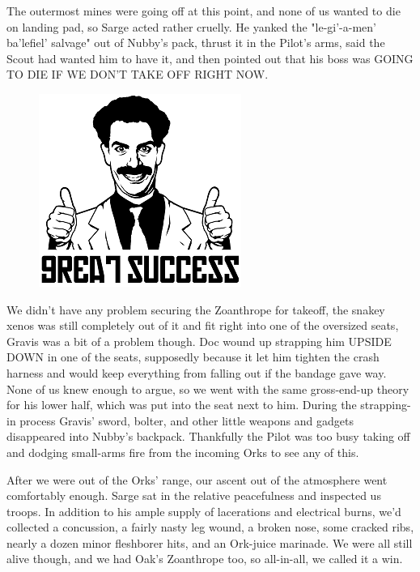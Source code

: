 The outermost mines were going off at this point, and none of us wanted to die on landing pad, so Sarge acted rather cruelly. 
He yanked the "le-gi'-a-men' ba'lefiel' salvage" out of Nubby's pack, thrust it in the Pilot's arms, said the Scout had wanted him to have it, and then pointed out that his boss was GOING TO DIE IF WE DON'T TAKE OFF RIGHT NOW.

\begin{figure}
	\begin{center}
		\includegraphics[width=\figwidth]{pics/12/58.png}
	\end{center}
\end{figure}
We didn't have any problem securing the Zoanthrope for takeoff, the snakey xenos was still completely out of it and fit right into one of the oversized seats, Gravis was a bit of a problem though. 
Doc wound up strapping him UPSIDE DOWN in one of the seats, supposedly because it let him tighten the crash harness and would keep everything from falling out if the bandage gave way. 
None of us knew enough to argue, so we went with the same gross-end-up theory for his lower half, which was put into the seat next to him. 
During the strapping-in process Gravis' sword, bolter, and other little weapons and gadgets disappeared into Nubby's backpack. 
Thankfully the Pilot was too busy taking off and dodging small-arms fire from the incoming Orks to see any of this.

After we were out of the Orks' range, our ascent out of the atmosphere went comfortably enough. 
Sarge sat in the relative peacefulness and inspected us troops. 
In addition to his ample supply of lacerations and electrical burns, we'd collected a concussion, a fairly nasty leg wound, a broken nose, some cracked ribs, nearly a dozen minor fleshborer hits, and an Ork-juice marinade. 
We were all still alive though, and we had Oak's Zoanthrope too, so all-in-all, we called it a win.

